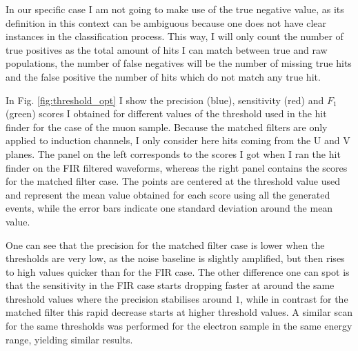 In our specific case I am not going to make use of the true negative value, as its definition in this context can be ambiguous because one does not have clear instances in the classification process. This way, I will only count the number of true positives as the total amount of hits I can match between true and raw populations, the number of false negatives will be the number of missing true hits and the false positive the number of hits which do not match any true hit.

In Fig. \ref{fig:threshold_opt} I show the precision (blue), sensitivity (red) and $F_{1}$ (green) scores I obtained for different values of the threshold used in the hit finder for the case of the muon sample. Because the matched filters are only applied to induction channels, I only consider here hits coming from the U and V planes. The panel on the left corresponds to the scores I got when I ran the hit finder on the FIR filtered waveforms, whereas the right panel contains the scores for the matched filter case. The points are centered at the threshold value used and represent the mean value obtained for each score using all the generated events, while the error bars indicate one standard deviation around the mean value.

One can see that the precision for the matched filter case is lower when the thresholds are very low, as the noise baseline is slightly amplified, but then rises to high values quicker than for the FIR case. The other difference one can spot is that the sensitivity in the FIR case starts dropping faster at around the same threshold values where the precision stabilises around $1$, while in contrast for the matched filter this rapid decrease starts at higher threshold values. A similar scan for the same thresholds was performed for the electron sample in the same energy range, yielding similar results.

